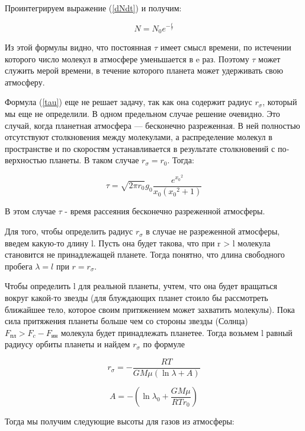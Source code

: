 \documentclass[a4paper,12pt]{article}
\begin{document}
 Проинтегрируем выражение (\ref{dNdt}) и получим:
 
 \begin{equation}\label{N}
 	N = N_0e^{-\frac{t}{\tau}}
 \end{equation}
 
 Из этой формулы видно, что постоянная $\tau$ имеет смысл времени, по истечении которого число молекул в атмосфере уменьшается в e раз. Поэтому $\tau$ может служить мерой времени, в течение которого планета может удерживать свою атмосферу.

Формула (\ref{tau}) еще не решает задачу, так как она содержит радиус $r_{\sigma}$, который мы еще не определили. В одном предельном случае решение очевидно. Это случай, когда планетная атмосфера — бесконечно разреженная. В ней пол­ностью отсутствуют столкновения между молекулами, а распределение молекул в пространстве и по скоростям устанавливается в результате столкновений с по­верхностью планеты. В таком случае $r_{\sigma} = r_0$. Тогда:

\begin{equation}\label{SimpleTau}
	\tau = \sqrt{2\pi r_0}{g_0} \frac{e^{{x_0}^2}}{x_0({x_0}^2 + 1)}
\end{equation}

В этом случае $\tau$ - время рассеяния бесконечно разреженной атмосферы.

Для того, чтобы определить радиус $r_{\sigma}$ в случае не разреженной атмосферы, введем какую-то длину l. Пусть она будет такова, что при r > l молекула становится не принадлежащей планете. Тогда понятно, что длина свободного пробега $\lambda = l$ при $r = r_{\sigma}$.

Чтобы определить l для реальной планеты, учтем, что она будет вращаться вокруг какой-то звезды (для блуждающих планет стоило бы рассмотреть ближайшее тело, которое своим притяжением может захватить молекулы). Пока сила притяжения планеты больше чем со стороны звезды (Солнца) $F_{\text{пл}} > F_c - F_{\text{ин}} $ молекула будет принадлежать планетее. Тогда возьмем l равный радиусу орбиты планеты и найдем $r_{\sigma}$ по формуле 

\begin{equation}
	r_{\sigma} = -\frac{RT}{GM\mu (\ln\lambda + A)} 
\end{equation}

\begin{equation}
	A = -(\ln\lambda_0 + \frac{GM\mu}{RTr_0})
\end{equation}

Тогда мы получим следующие высоты для газов из атмосферы:
\end{document}
